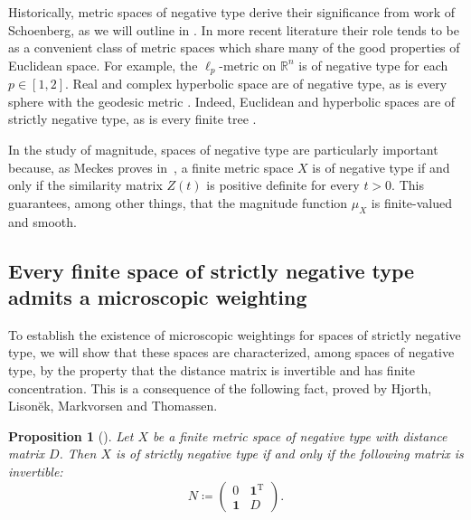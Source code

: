 \documentclass[a4paper, oneside, reqno]{amsart}
\newtheorem{prop}[theorem]{Proposition}
\theoremstyle{definition}
\theoremstyle{remark}
\numberwithin{equation}{section}
\newcommand{\onevector}{\mathbf{1}}
\newcommand{\transpose}{\mathrm{T}}
\newcommand{\R}{\mathbb{R}}
\begin{document}
Historically, metric spaces of negative type derive their significance from work of Schoenberg, as we will outline in . In more recent literature their role tends to be as a convenient class of metric spaces which share many of the good properties of Euclidean space. For example, the \(\ell_p\)-metric on \(\R^n\) is of negative type for each \(p \in [1,2]\). Real and complex hyperbolic space are of negative type, as is every sphere with the geodesic metric \cite[Theorem~3.6]{MeckesPositive2013}. Indeed, Euclidean and hyperbolic spaces are of strictly negative type, as is every finite tree \cite{HLMT1998, HKM2002}.

In the study of magnitude, spaces of negative type are particularly important because, as Meckes proves in~\cite[Theorem~3.3]{MeckesPositive2013}, a finite metric space \(X\) is of negative type if and only if the similarity matrix \(Z(t)\) is positive definite for every \(t > 0\). This guarantees, among other things, that the magnitude function \(\mu_X\) is finite-valued and smooth.


\subsection{Every finite space of strictly negative type admits a microscopic weighting}
\label{sec:strict_negative_type_existence}

To establish the existence of microscopic weightings for spaces of strictly negative type, we will show that these spaces are characterized, among spaces of negative type, by the property that the distance matrix is invertible and has finite concentration. This is a consequence of the following fact, proved by Hjorth, Lison\u{e}k, Markvorsen and Thomassen.

\begin{prop}[{\cite[Proof of Lemma~3.6]{HLMT1998}}]
\label{prop:det_nonzero_strictly_NT}
    Let \(X\) be a finite metric space of negative type with distance matrix \(D\). Then \(X\) is of strictly negative type if and only if the following matrix is invertible:
    \begin{equation*}
    \label{eq:N_X}
    N \coloneq \begin{pmatrix}
	0 & \onevector^\transpose \\
	\onevector & D
    \end{pmatrix}.
    \end{equation*}
\end{prop}
\end{document}
